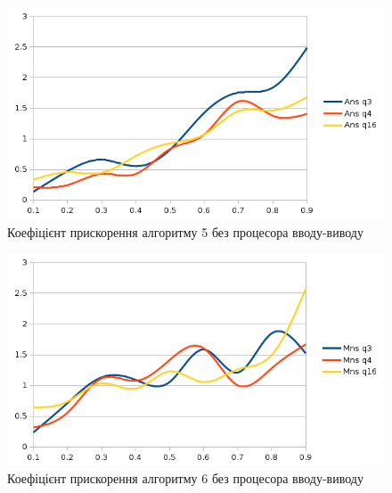 \begin{figure}[h]
  \begin{center}
    \includegraphics[width=\textwidth]{res/noio_ans.png}
  \end{center}
  \caption{Коефіцієнт прискорення алгоритму 5 без процесора вводу-виводу}
\label{fig:noio_ans}
\end{figure}

\begin{figure}[h]
  \begin{center}
    \includegraphics[width=\textwidth]{res/noio_mns.png}
  \end{center}
  \caption{Коефіцієнт прискорення алгоритму 6 без процесора вводу-виводу}
\label{fig:noio_mns}
\end{figure}

